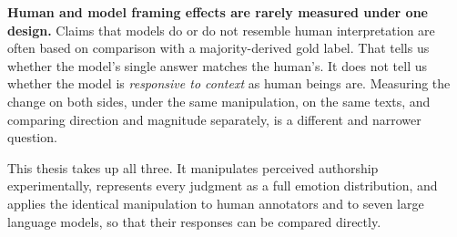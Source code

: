 \textbf{Human and model framing effects are rarely measured under one design.} Claims that models
do or do not resemble human interpretation are often based on comparison with a
majority-derived gold label. That tells us whether the model's single answer matches the human's.
It does not tell us whether the model is \emph{responsive to context} as human beings are.
Measuring the change on both sides, under the same manipulation, on the same texts, and comparing
direction and magnitude separately, is a different and narrower question.

\noindent
This thesis takes up all three. It manipulates perceived authorship experimentally, represents
every judgment as a full emotion distribution, and applies the identical manipulation to human
annotators and to seven large language models, so that their responses can be compared directly.
